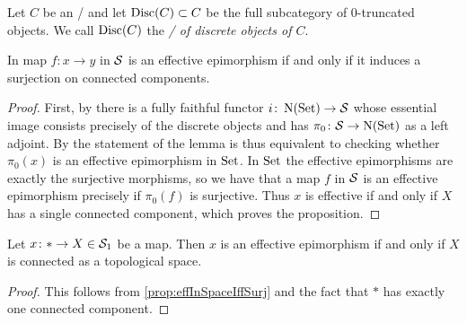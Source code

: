 \begin{definition}
    Let $C$ be an \inftytop/ and let $\operatorname{Disc}(C)\subset C$ be the full subcategory of $0$-truncated objects.
    We call $\operatorname{Disc}(C)$ the \emph{\inftycat/ of discrete objects of $C$}.
\end{definition}
\begin{prop}\label{prop:effInSpaceIffSurj}
    In map $f\colon x\to y$ in $\mathcal{S}$ is an effective epimorphism if and only if it induces a surjection on connected components.
    \begin{proof}
        First, by %
        there is a fully faithful functor $i\colon\operatorname{N}(\operatorname{Set})\to\mathcal{S}$ whose essential image consists precisely of the discrete objects and has $\pi_0\colon\mathcal{S}\to\operatorname{N}(\operatorname{Set})$ as a left adjoint.
        By %
        the statement of the lemma is thus equivalent to checking whether $\pi_0(x)$ is an effective epimorphism in $\operatorname{Set}$.
        In $\operatorname{Set}$ the effective epimorphisms are exactly the surjective morphisms, so we have that a map $f$ in $\mathcal{S}$ is an effective epimorphism precisely if $\pi_0(f)$ is surjective.
        Thus $x$ is effective if and only if $X$ has a single connected component, which proves the proposition.
    \end{proof}
\end{prop}
\begin{corollary} %
    Let $x\colon*\to X\in\mathcal{S}_1$ be a map.
    Then $x$ is an effective epimorphism if and only if $X$ is connected as a topological space.
    \begin{proof}
        This follows from \cref{prop:effInSpaceIffSurj} and the fact that $*$ has exactly one connected component.
    \end{proof}
\end{corollary}
    
